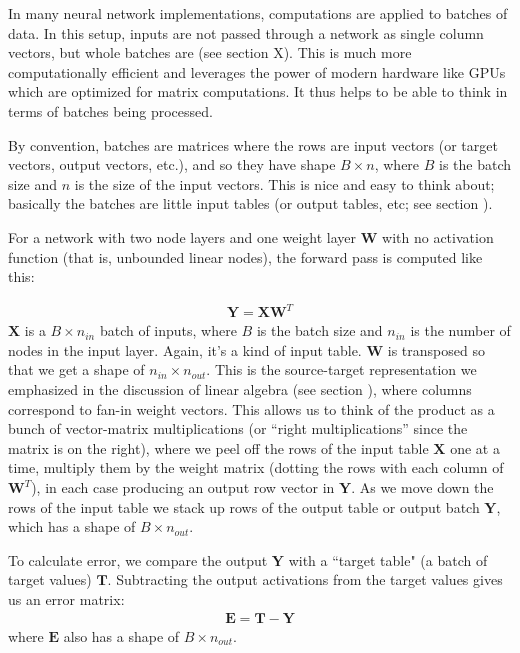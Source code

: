 In many neural network implementations, computations are applied to batches of data. In this setup, inputs are not passed through a network as single column vectors, but whole batches are (see section X). This is much more computationally efficient and leverages the power of modern hardware like GPUs which are optimized for matrix computations.  It thus helps to be able to think in terms of batches being processed.

By convention, batches are matrices where the rows are input vectors (or target vectors, output vectors, etc.), and so they have shape $B \times n$, where $B$ is the batch size and $n$ is the size of the input vectors. This is nice and easy to think about; basically the batches are little input tables (or output tables, etc; see section ).


For a network with two node layers and one weight layer $\mathbf{W}$ with no activation function (that is, unbounded linear nodes), the forward pass is computed like this:

\begin{eqnarray}
\mathbf{Y} = \mathbf{X} \mathbf{W}^T
\end{eqnarray}
$\mathbf{X}$ is a  $B \times n_{in}$ batch of inputs, where $B$ is the batch size and $n_{in}$ is the number of nodes in the input layer. Again, it's a kind of input table. $\mathbf{W}$ is transposed so that we get a shape of $n_{in} \times n_{out}$. This is the source-target representation we emphasized in the discussion of linear algebra (see section ), where columns correspond to fan-in weight vectors. This allows us to think of the product as a bunch of vector-matrix multiplications (or ``right multiplications'' since the matrix is on the right), where we peel off the rows of the input table $\mathbf{X}$ one at a time, multiply them by the weight matrix (dotting the rows with each column of $\mathbf{W}^T$), in each case producing an output row vector in $\mathbf{Y}$. As we move down the rows of the input table we stack up rows of the output table or output batch $\mathbf{Y}$, which has a shape of $B \times n_{out}$.

To calculate error, we compare the output $\mathbf{Y}$ with a ``target table" (a batch of target values) $\mathbf{T}$. Subtracting the output activations from the target values  gives us an error matrix:
\begin{eqnarray}
\mathbf{E} = \mathbf{T} - \mathbf{Y}
\end{eqnarray}
where $\mathbf{E}$ also has a shape of $B \times n_{out}$.

